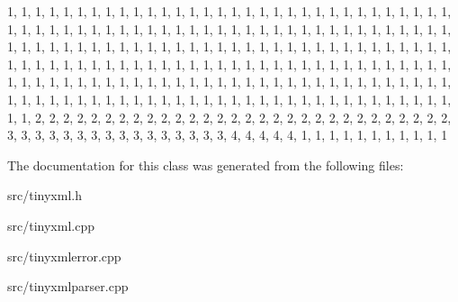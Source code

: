 \begin{DoxyCode}

{
        
                1,      1,      1,      1,      1,      1,      1,      1,      
      1,       1,      1,      1,      1,      1,      1,      1,      
                1,      1,      1,      1,      1,      1,      1,      1,      
      1,       1,      1,      1,      1,      1,      1,      1,      
                1,      1,      1,      1,      1,      1,      1,      1,      
      1,       1,      1,      1,      1,      1,      1,      1,      
                1,      1,      1,      1,      1,      1,      1,      1,      
      1,       1,      1,      1,      1,      1,      1,      1,      
                1,      1,      1,      1,      1,      1,      1,      1,      
      1,       1,      1,      1,      1,      1,      1,      1,      
                1,      1,      1,      1,      1,      1,      1,      1,      
      1,       1,      1,      1,      1,      1,      1,      1,      
                1,      1,      1,      1,      1,      1,      1,      1,      
      1,       1,      1,      1,      1,      1,      1,      1,      
                1,      1,      1,      1,      1,      1,      1,      1,      
      1,       1,      1,      1,      1,      1,      1,      1,      
                1,      1,      1,      1,      1,      1,      1,      1,      
      1,       1,      1,      1,      1,      1,      1,      1,      
                1,      1,      1,      1,      1,      1,      1,      1,      
      1,       1,      1,      1,      1,      1,      1,      1,      
                1,      1,      1,      1,      1,      1,      1,      1,      
      1,       1,      1,      1,      1,      1,      1,      1,      
                1,      1,      1,      1,      1,      1,      1,      1,      
      1,       1,      1,      1,      1,      1,      1,      1,      
                1,      1,      2,      2,      2,      2,      2,      2,      
      2,       2,      2,      2,      2,      2,      2,      2,      
                2,      2,      2,      2,      2,      2,      2,      2,      
      2,       2,      2,      2,      2,      2,      2,      2,      
                3,      3,      3,      3,      3,      3,      3,      3,      
      3,       3,      3,      3,      3,      3,      3,      3,      
                4,      4,      4,      4,      4,      1,      1,      1,      
      1,       1,      1,      1,      1,      1,      1,      1       
}
\end{DoxyCode}


\-The documentation for this class was generated from the following files\-:\begin{DoxyCompactItemize}
\item 
src/tinyxml.\-h\item 
src/tinyxml.\-cpp\item 
src/tinyxmlerror.\-cpp\item 
src/tinyxmlparser.\-cpp\end{DoxyCompactItemize}
